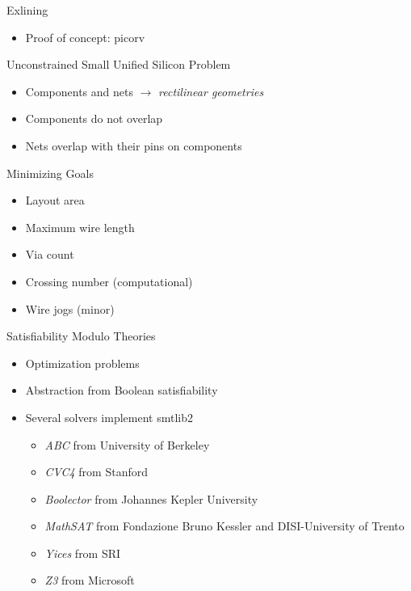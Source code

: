\documentclass[aspectratio=169]{beamer}
\begin{document}
\begin{frame}{Exlining}
	\begin{itemize}
        \setlength\itemsep{1em}
		\item Proof of concept: picorv
	\end{itemize}
        \begin{center}
            \href{url}{}
        \end{center}
\end{frame}

\begin{frame}{Unconstrained Small Unified Silicon Problem}
	\begin{itemize}
        \setlength\itemsep{1em}
		\item Components and nets $\rightarrow$ \textit{rectilinear geometries}
		\item Components do not overlap
		\item Nets overlap with their pins on components
	\end{itemize}
\end{frame}

\begin{frame}{Minimizing Goals}
	\begin{itemize}
        \setlength\itemsep{1em}
		\item Layout area
		\item Maximum wire length 
		\item Via count
		\item Crossing number (computational)
		\item Wire jogs (minor)
	\end{itemize}
\end{frame}

\begin{frame}{Satisfiability Modulo Theories}
	\begin{itemize}
        \setlength\itemsep{1em}
            \item Optimization problems
            \item Abstraction from Boolean satisfiability
            \item Several solvers implement smtlib2
	    \begin{itemize}
                \item \textit{ABC} from University of Berkeley
                \item \textit{CVC4} from Stanford
                \item \textit{Boolector} from Johannes Kepler University
                \item \textit{MathSAT} from Fondazione Bruno Kessler and DISI-University of Trento
                \item \textit{Yices} from SRI
                \item \textit{Z3} from Microsoft
	    \end{itemize}
	\end{itemize}
\end{frame}
\end{document}
